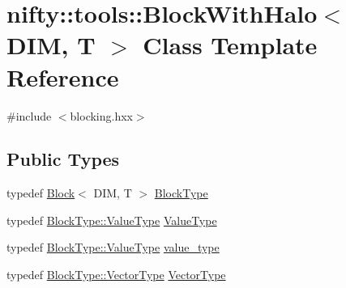 \hypertarget{classnifty_1_1tools_1_1BlockWithHalo}{}\section{nifty\+:\+:tools\+:\+:Block\+With\+Halo$<$ D\+IM, T $>$ Class Template Reference}
\label{classnifty_1_1tools_1_1BlockWithHalo}


{\ttfamily \#include $<$blocking.\+hxx$>$}

\subsection*{Public Types}
\begin{DoxyCompactItemize}
\item 
typedef \hyperlink{classnifty_1_1tools_1_1Block}{Block}$<$ D\+IM, T $>$ \hyperlink{classnifty_1_1tools_1_1BlockWithHalo_a98d2c04518f8902ab6d985feba605987}{Block\+Type}
\item 
typedef \hyperlink{classnifty_1_1tools_1_1Block_a3e77342701a32fcc670d398f1b9bc6d4}{Block\+Type\+::\+Value\+Type} \hyperlink{classnifty_1_1tools_1_1BlockWithHalo_a65d120db84dfca7586ae5ab30f26f01b}{Value\+Type}
\item 
typedef \hyperlink{classnifty_1_1tools_1_1Block_a3e77342701a32fcc670d398f1b9bc6d4}{Block\+Type\+::\+Value\+Type} \hyperlink{classnifty_1_1tools_1_1BlockWithHalo_a2b9bb6388ec694b2e1f13399be84356d}{value\+\_\+type}
\item 
typedef \hyperlink{classnifty_1_1tools_1_1Block_aa077b4ebbf3e4e9b679d1957ca10ba32}{Block\+Type\+::\+Vector\+Type} \hyperlink{classnifty_1_1tools_1_1BlockWithHalo_a040d8a654eb42791c6e5fbd4dfd51b9f}{Vector\+Type}
\end{DoxyCompactItemize}
